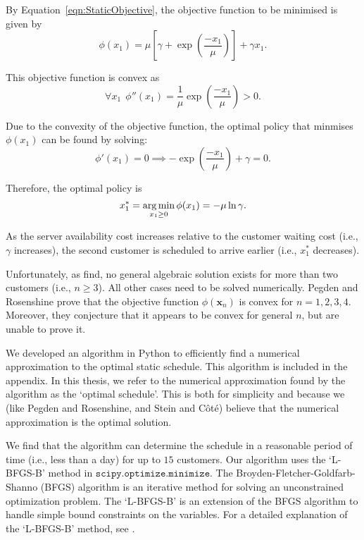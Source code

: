 By Equation~\ref{eqn:StaticObjective}, the objective function to be minimised is given by
\begin{equation}
	\phi (x_{1}) = \mu \left[ \gamma + \exp \left( \frac{- x_{1}}{\mu} \right) \right] + \gamma x_{1}.
\end{equation}

This objective function is convex as
\begin{equation}
	\forall x_{1} \ \ \phi'' (x_{1}) = \frac{1}{\mu} \exp \left( \frac{- x_{1}}{\mu} \right) > 0.
\end{equation}

Due to the convexity of the objective function, the optimal policy that minmises $\phi (x_{1})$ can be found by solving:
\begin{equation}
	\phi' (x_{1}) = 0 \implies - \exp \left( \frac{- x_{1}}{\mu} \right) + \gamma = 0.
\end{equation}

Therefore, the optimal policy is
\begin{equation}
	x_{1}^{*} = \operatorname*{arg\,min}_{x_{1} \geq 0} \phi (x_{1}) = - \mu \ln \gamma.
\end{equation}

As the server availability cost increases relative to the customer waiting cost (i.e., $\gamma$ increases), the second customer is scheduled to arrive earlier (i.e., $x_{1}^{*}$ decreases).

Unfortunately, as \citet{Pegden} find, no general algebraic solution exists for more than two customers (i.e., $n \geq 3$). All other cases need to be solved numerically. Pegden and Rosenshine prove that the objective function $\phi (\mathbf{x}_{n})$ is convex for $n = 1, 2, 3, 4$. Moreover, they conjecture that it appears to be convex for general $n$, but are unable to prove it.

We developed an algorithm in Python to efficiently find a numerical approximation to the optimal static schedule. This algorithm is included in the appendix. In this thesis, we refer to the numerical approximation found by the algorithm as the `optimal schedule'. This is both for simplicity and because we (like Pegden and Rosenshine, and Stein and C\^{o}t\'{e}) believe that the numerical approximation is the optimal solution.

We find that the algorithm can determine the schedule in a reasonable period of time (i.e., less than a day) for up to $15$ customers. Our algorithm uses the `L-BFGS-B' method in $\texttt{scipy.optimize.minimize}$. The Broyden-Fletcher-Goldfarb-Shanno (BFGS) algorithm is an iterative method for solving an unconstrained optimization problem. The `L-BFGS-B' is an extension of the BFGS algorithm to handle simple bound constraints on the variables. For a detailed explanation of the `L-BFGS-B' method, see \citet{Byrd}.

